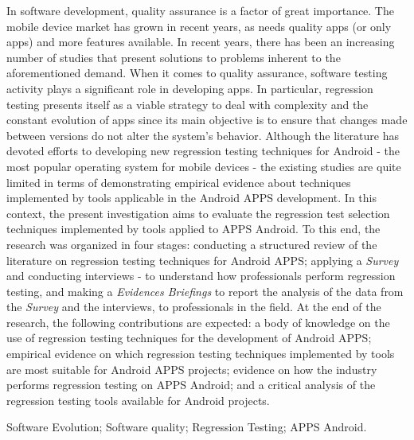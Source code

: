 


\abstract


In software development, quality assurance is a factor of great importance. The mobile device market has grown in recent years, as needs quality apps (or only apps) and more features available. In recent years, there has been an increasing number of studies that present solutions to problems inherent to the aforementioned demand. When it comes to quality assurance, software testing activity plays a significant role in developing apps. In particular, regression testing presents itself as a viable strategy to deal with complexity and the constant evolution of apps since its main objective is to ensure that changes made between versions do not alter the system's behavior. Although the literature has devoted efforts to developing new regression testing techniques for Android - the most popular operating system for mobile devices - the existing studies are quite limited in terms of demonstrating empirical evidence about techniques implemented by tools applicable in the Android \ac {APPS} development. In this context, the present investigation aims to evaluate the regression test selection techniques implemented by tools applied to \ac {APPS} Android. To this end, the research was organized in four stages: conducting a structured review of the literature on regression testing techniques for Android \ac {APPS}; applying a \textit {Survey} and conducting interviews - to understand how professionals perform regression testing, and making a \textit {Evidences Briefings} to report the analysis of the data from the \textit {Survey} and the interviews, to professionals in the field. At the end of the research, the following contributions are expected: a body of knowledge on the use of regression testing techniques for the development of Android \ac {APPS}; empirical evidence on which regression testing techniques implemented by tools are most suitable for Android \ac {APPS} projects; evidence on how the industry performs regression testing on \ac {APPS} Android; and a critical analysis of the regression testing tools available for Android projects.


\begin{keywords}
Software Evolution; Software quality; Regression Testing; APPS Android.%
\end{keywords}